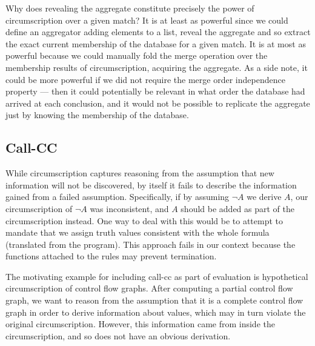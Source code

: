 Why does revealing the aggregate constitute precisely the power of circumscription over a given match?
It is at least as powerful since we could define an aggregator adding elements to a list, reveal the aggregate and so extract the exact current membership of the database for a given match.
It is at most as powerful because we could manually fold the merge operation over the membership results of circumscription, acquiring the aggregate.
As a side note, it could be more powerful if we did not require the merge order independence property --- then it could potentially be relevant in what order the database had arrived at each conclusion, and it would not be possible to replicate the aggregate just by knowing the membership of the database.

\subsection{Call-CC}
\label{sec:callcc}
While circumscription captures reasoning from the assumption that new information will not be discovered, by itself it fails to describe the information gained from a failed assumption.
Specifically, if by assuming $\neg A$ we derive $A$, our circumscription of $\neg A$ was inconsistent, and $A$ should be added as part of the circumscription instead.
One way to deal with this would be to attempt to mandate that we assign truth values consistent with the whole formula (translated from the program).
This approach fails in our context because the functions attached to the rules may prevent termination.

The motivating example for including call-cc as part of evaluation is hypothetical circumscription of control flow graphs.
After computing a partial control flow graph, we want to reason from the assumption that it is a complete control flow graph in order to derive information about values, which may in turn violate the original circumscription.
However, this information came from inside the circumscription, and so does not have an obvious derivation.

